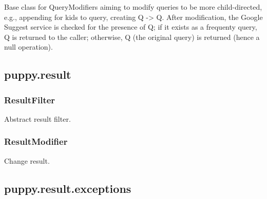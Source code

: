 \documentclass[letterpaper,10pt,english]{sphinxmanual}
\begin{document}
\begin{fulllineitems}
Base class for QueryModifiers aiming to modify queries to be more
child-directed, e.g., appending for kids to query, creating Q -\textgreater{} Q.
After modification, the Google Suggest service is checked for the
presence of Q; if it exists as a frequenty query, Q is returned to
the caller; otherwise, Q (the original query) is returned (hence a null
operation).

\end{fulllineitems}



\subsection{puppy.result}
\label{api3.0:puppy-result}\label{api3.0:module-puppy.result}

\subsubsection{ResultFilter}
\label{api3.0:resultfilter}

\begin{fulllineitems}
\label{api3.0:puppy.result.ResultFilter}
Abstract result filter.

\end{fulllineitems}



\subsubsection{ResultModifier}
\label{api3.0:resultmodifier}

\begin{fulllineitems}
\label{api3.0:puppy.result.ResultModifier}
Change result.

\end{fulllineitems}



\subsection{puppy.result.exceptions}
\label{api3.0:puppy-result-exceptions}\label{api3.0:module-puppy.result.exceptions}
\end{document}
